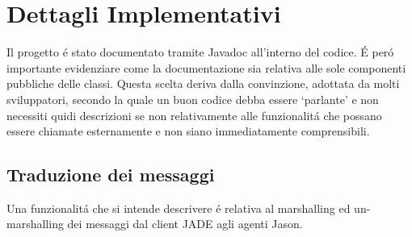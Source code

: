 \section{Dettagli Implementativi}


Il progetto \'e stato documentato tramite Javadoc all'interno del codice. \'E per\'o importante evidenziare come la documentazione sia relativa alle sole componenti pubbliche delle classi. Questa scelta deriva dalla convinzione, adottata da molti sviluppatori, secondo la quale un buon codice debba essere `parlante' e non necessiti quidi descrizioni se non relativamente alle funzionalit\'a che possano essere chiamate esternamente e non siano immediatamente comprensibili.

\subsection{Traduzione dei messaggi}
Una funzionalit\'a che si intende descrivere \'e relativa al marshalling ed un-marshalling dei messaggi dal client JADE agli agenti Jason.

